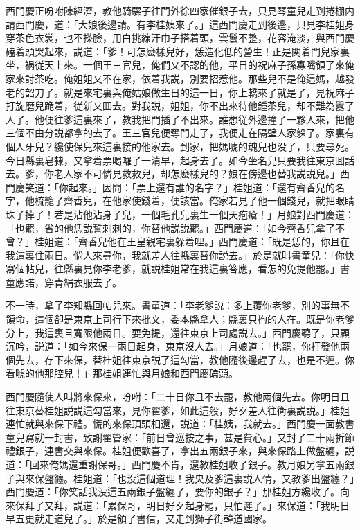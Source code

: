 西門慶正吩咐陳經濟，教他騎騾子往門外徐四家催銀子去，只見琴童兒走到捲棚内請西門慶，道：「大娘後邊請。有李桂姨來了。」這西門慶走到後邊，只見李桂姐身穿茶色衣裳，也不搽臉，用白挑線汗巾子搭着頭，雲鬟不整，花容淹淡，與西門慶磕着頭哭起來，説道：「爹！可怎麽樣兒好，恁造化低的營生！正是関着門兒家裏坐，祸従天上來。一個王三官兒，俺們又不認的他，平日的祝麻子孫寡嘴領了來俺家來討茶吃。俺姐姐又不在家，依着我説，別要招惹他。那些兒不是俺這媽，越發老的韶刀了。就是來宅裏與俺姑娘做生日的這一日，你上轎來了就是了，見祝麻子打旋磨兒跪着，従新又囬去。對我説，姐姐，你不出來待他鍾茶兒，却不難為囂了人了。他便往爹這裏來了，教我把門插了不出來。誰想従外邊撞了一夥人來，把他三個不由分説都拿的去了。王三官兒便奪門走了，我便走在隔壁人家躲了。家裏有個人牙兒？纔使保兒來這裏接的他家去。到家，把媽唬的魂兒也没了，只要尋死。今日縣裏皂隸，又拿着票喝囉了一清早，起身去了。如今坐名兒只要我往東京囬話去。爹，你老人家不可憐見救救兒，却怎麽樣兒的？娘在傍邊也替我説説兒。」西門慶笑道：「你起來。」因問：「票上還有誰的名字？」桂姐道：「還有齊香兒的名字，他梳籠了齊香兒，在他家使錢着，便該當。俺家若見了他一個錢兒，就把眼睛珠子掉了！若是沾他沾身子兒，一個毛孔兒裏生一個天疱瘡！」月娘對西門慶道：「也罷，省的他恁説誓剌剌的，你替他説説罷。」西門慶道：「如今齊香兒拿了不曾？」桂姐道：「齊香兒他在王皇親宅裏躲着哩。」西門慶道：「既是恁的，你且在我這裏住兩日。倘人來尋你，我就差人往縣裏替你説去。」於是就叫書童兒：「你快寫個帖兒，往縣裏見你李老爹，就説桂姐常在我這裏答應，看怎的免提他罷。」書童應諾，穿青絹衣服去了。

不一時，拿了李知縣回帖兒來。書童道：「李老爹説：多上覆你老爹，別的事無不領命，這個卻是東京上司行下來批文，委本縣拿人；縣裏只拘的人在。既是你老爹分上，我這裏且寬限他兩日。要免提，還往東京上司處説去。」西門慶聽了，只顧沉吟，説道：「如今來保一兩日起身，東京沒人去。」月娘道：「也罷，你打發他兩個先去，存下來保，替桂姐往東京説了這勾當，教他隨後邊趕了去，也是不遲。你看唬的他那腔兒！」那桂姐連忙與月娘和西門慶磕頭。

西門慶隨使人叫將來保來，吩咐：「二十日你且不去罷，教他兩個先去。你明日且往東京替桂姐説説這勾當來，見你翟爹，如此這般，好歹差人往衛裏説説。」桂姐連忙就與來保下禮。慌的來保頂頭相還，説道：「桂姨，我就去。」西門慶一面教書童兒寫就一封書，致謝翟管家：「前日曾巡按之事，甚是費心。」又封了二十兩折節禮銀子，連書交與來保。桂姐便歡喜了，拿出五兩銀子來，與來保路上做盤纏，説道：「回來俺媽還重謝保哥。」西門慶不肯，還教桂姐收了銀子。教月娘另拿五兩銀子與來保盤纏。桂姐道：「也没這個道理！我央及爹這裏説人情，又教爹出盤纏？」西門慶道：「你笑話我没這五兩銀子盤纏了，要你的銀子？」那桂姐方纔收了。向來保拜了又拜，説道：「累保哥，明日好歹起身罷，只怕遲了。」來保道：「我明日早五更就走道兒了。」於是領了書信，又走到獅子街韓道國家。

